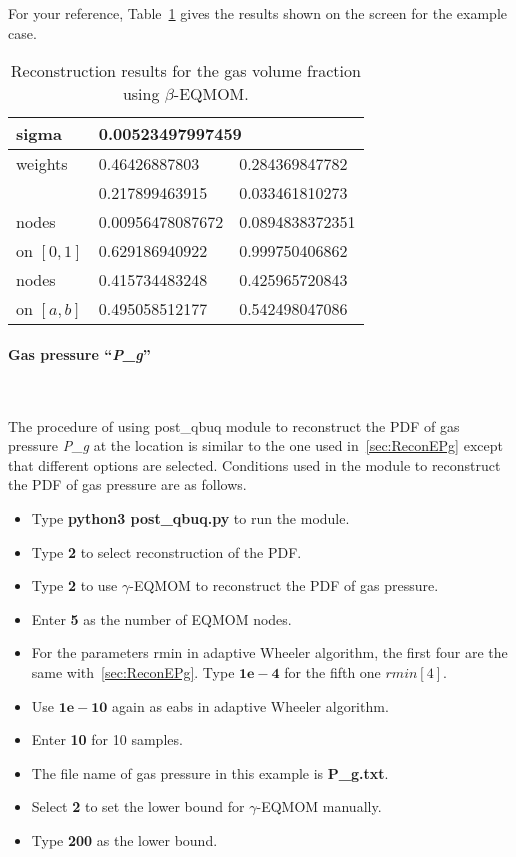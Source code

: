 \documentclass[a4paper,12pt,titlepage]{article}
\begin{document}
For your reference, Table~\ref{tab:ReconEPg} gives the results shown on the
screen for the example case.

\begin{table}[htp]
 \centering
 \begin{tabular}{l|ll} \hline
  sigma       & \multicolumn{2}{l}{0.00523497997459} \\ \hline
  weights     & 0.46426887803    & 0.284369847782    \\ 
              & 0.217899463915   & 0.033461810273    \\ \hline
  nodes       & 0.00956478087672 & 0.0894838372351   \\
  on $[0, 1]$ & 0.629186940922   & 0.999750406862    \\ \hline
  nodes       & 0.415734483248   & 0.425965720843    \\ 
  on $[a, b]$ & 0.495058512177   & 0.542498047086    \\ \hline
 \end{tabular}
 \caption{Reconstruction results for the gas volume fraction using $\beta$-EQMOM.}
 \label{tab:ReconEPg}
\end{table}

\paragraph{Gas pressure ``\emph{P\_g}''}\mbox{}\\
\label{sec:ReconPg}

The procedure of using post\_qbuq module to reconstruct the PDF of gas pressure
\emph{P\_g} at the location is similar to the one used in~\ref{sec:ReconEPg}
except that different options are selected. Conditions used in the module to
reconstruct the PDF of gas pressure are as follows.

\begin{itemize}
 \item Type \textbf{python3 post\_qbuq.py} to run the module.
 \item Type \textbf{2} to select reconstruction of the PDF.
 \item Type \textbf{2} to use $\gamma$-EQMOM to reconstruct the PDF of gas 
 pressure.
 \item Enter \textbf{5} as the number of EQMOM nodes.
 \item For the parameters rmin in adaptive Wheeler algorithm, the first four are 
 the same with~\ref{sec:ReconEPg}. Type $\mathbf{1e-4}$ for the fifth one 
 $rmin[4]$.
 \item Use $\mathbf{1e-10}$ again as eabs in adaptive Wheeler algorithm.
 \item Enter \textbf{10} for 10 samples.
 \item The file name of gas pressure in this example is \textbf{P\_g.txt}.
 \item Select \textbf{2} to set the lower bound for $\gamma$-EQMOM manually.
 \item Type \textbf{200} as the lower bound.
\end{itemize}
\end{document}
